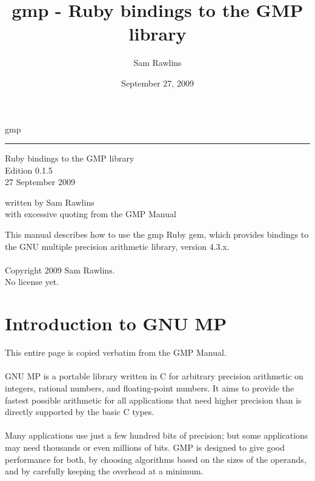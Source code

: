 \documentclass[pdftex,10pt]{article}
\title{gmp - Ruby bindings to the GMP library}
\date{September 27, 2009}
\author{Sam Rawlins}
\newcommand{\HRule}{\rule{\linewidth}{0.8mm}}
\begin{document}
\huge{gmp}\\
\HRule
\begin{flushright}
\large{Ruby bindings to the GMP library}\\
\large{Edition 0.1.5}\\
\large{27 September 2009}\\
\end{flushright}
\vfill
\large{written by Sam Rawlins}\\
\large{with excessive quoting from the GMP Manual}
\newpage

\vfill
This manual describes how to use the gmp Ruby gem, which provides bindings to
the GNU multiple precision arithmetic library, version 4.3.x.\\
\\
Copyright 2009 Sam Rawlins.\\
No license yet.
\newpage

\tableofcontents
\newpage

\section{Introduction to GNU MP}

This entire page is copied verbatim from the GMP Manual.\\\\

GNU MP is a portable library written in C for arbitrary precision arithmetic on
integers, rational numbers, and floating-point numbers. It aims to provide the
fastest possible arithmetic for all applications that need higher precision
than is directly supported by the basic C types.\\\\

Many applications use just a few hundred bits of precision; but some
applications may need thousands or even millions of bits. GMP is designed to
give good performance for both, by choosing algorithms based on the sizes of
the operands, and by carefully keeping the overhead at a minimum.\\\\
\end{document}
